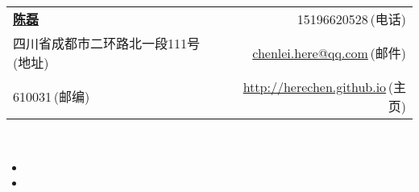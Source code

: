 \documentclass[letterpaper,11pt]{article}
\begin{document}

\newcommand{\myheader}{
\begin{tabular*}{7.0in}{l@{\extracolsep{\fill}}r}
  \textbf{\href{http://herechen.github.io}{\LARGE 陈磊}} & 15196620528$\,${\color{labelgrey}(电话)} \\
  四川省成都市二环路北一段111号$\,${\color{labelgrey}(地址)} & \href{mailto:chenlei.here@qq.com}{chenlei.here@qq.com}$\,${\color{labelgrey}(邮件)} \\
  610031$\,${\color{labelgrey}(邮编)} & \href{http://herechen.github.io}{http://herechen.github.io}$\,${\color{labelgrey}(主页)} \\
  \end{tabular*}\\\vspace{0.1in}}

\myheader

  \begin{itemize}[leftmargin=*]
    \item
    \item
  \end{itemize}
\end{document}
